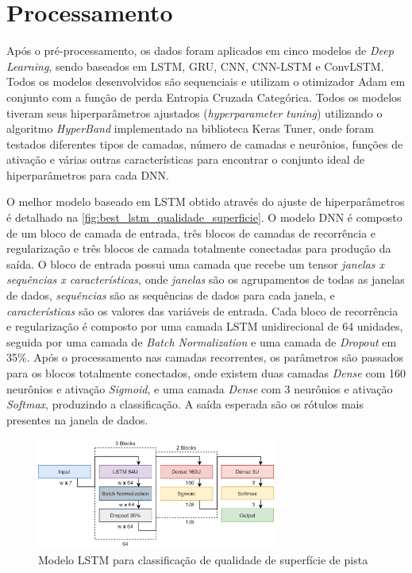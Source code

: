 \section{Processamento}

Após o pré-processamento, os dados foram aplicados em cinco modelos de \textit{Deep Learning}, sendo baseados em LSTM, GRU, CNN, CNN-LSTM e ConvLSTM. Todos os modelos desenvolvidos são sequenciais e utilizam o otimizador Adam em conjunto com a função de perda Entropia Cruzada Categórica. Todos os modelos tiveram seus hiperparâmetros ajustados (\textit{hyperparameter tuning}) utilizando o algoritmo \textit{HyperBand} implementado na biblioteca Keras Tuner, onde foram testados diferentes tipos de camadas, número de camadas e neurônios, funções de ativação e várias outras características para encontrar o conjunto ideal de hiperparâmetros para cada DNN. 

O melhor modelo baseado em LSTM obtido através do ajuste de hiperparâmetros é detalhado na \autoref{fig:best_lstm_qualidade_superficie}. O modelo DNN é composto de um bloco de camada de entrada, três blocos de camadas de recorrência e regularização e três blocos de camada totalmente conectadas para produção da saída. O bloco de entrada possui uma camada que recebe um tensor \emph{janelas x sequências x características}, onde \emph{janelas} são os agrupamentos de todas as janelas de dados, \emph{sequências} são as sequências de dados para cada janela, e \emph{características} são os valores das variáveis de entrada. Cada bloco de recorrência e regularização é composto por uma camada LSTM unidirecional de 64 unidades, seguida por uma camada de \textit{Batch Normalization} e uma camada de \textit{Dropout} em 35\%. Após o processamento nas camadas recorrentes, os parâmetros são passados para os blocos totalmente conectados, onde existem duas camadas \textit{Dense} com 160 neurônios e ativação \textit{Sigmoid}, e uma camada \textit{Dense} com 3 neurônios e ativação \textit{Softmax}, produzindo a classificação. A saída esperada são os rótulos mais presentes na janela de dados.

\begin{figure}[h!]
  \centering
  \caption{Modelo LSTM para classificação de qualidade de superfície de pista}
  \label{fig:best_lstm_qualidade_superficie}
  \includegraphics[width=0.7\textwidth]{figuras/fig_46.png}
\end{figure}

